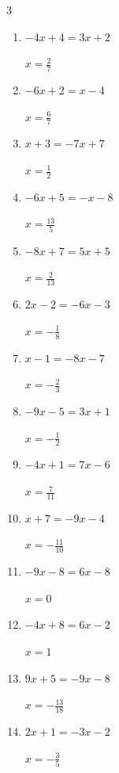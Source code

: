 \begin{multicols}{3}
\begin{enumerate}
        $\displaystyle x=\frac{2}{13}$

  \item $-4x+4=3x+2$

        $\displaystyle x=\frac{2}{7}$

  \item $-6x+2=x-4$

        $\displaystyle x=\frac{6}{7}$

\columnbreak %

  \item $x+3=-7x+7$

        $\displaystyle x=\frac{1}{2}$

  \item $-6x+5=-x-8$

        $\displaystyle x=\frac{13}{5}$

  \item $-8x+7=5x+5$

        $\displaystyle x=\frac{2}{13}$

  \item $2x-2=-6x-3$

        $\displaystyle x=-\frac{1}{8}$

  \item $x-1=-8x-7$

        $\displaystyle x=-\frac{2}{3}$

  \item $-9x-5=3x+1$

        $\displaystyle x=-\frac{1}{2}$

  \item $-4x+1=7x-6$

        $\displaystyle x=\frac{7}{11}$

  \item $x+7=-9x-4$

        $\displaystyle x=-\frac{11}{10}$

  \item $-9x-8=6x-8$

        $\displaystyle x=0$

  \item $-4x+8=6x-2$

        $\displaystyle x=1$

  \item $9x+5=-9x-8$

        $\displaystyle x=-\frac{13}{18}$

  \item $2x+1=-3x-2$

        $\displaystyle x=-\frac{3}{5}$


\end{enumerate}
\end{multicols}
